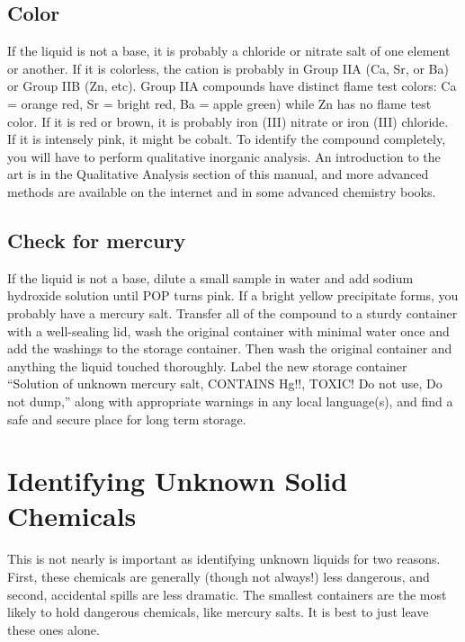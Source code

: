 \subsection{Color}
If the liquid is not a base, 
it is probably a chloride or nitrate salt of one element or another. 
If it is colorless, 
the cation is probably in Group IIA (Ca, 
Sr, 
or Ba) or Group IIB (Zn, 
etc). 
Group IIA compounds have distinct flame test colors: Ca = orange red, 
Sr = bright red, 
Ba = apple green) while Zn has no flame test color. 
If it is red or brown, 
it is probably iron (III) nitrate or iron (III) chloride. 
If it is intensely pink, 
it might be cobalt. 
To identify the compound completely, 
you will have to perform qualitative inorganic analysis. 
An introduction to the art is 
in the Qualitative Analysis section of this manual, 
and more advanced methods are available on the internet 
and in some advanced chemistry books.

\subsection{Check for mercury}
If the liquid is not a base, 
dilute a small sample in water 
and add sodium hydroxide solution until POP turns pink. 
If a bright yellow precipitate forms, 
you probably have a mercury salt. 
Transfer all of the compound to a sturdy container 
with a well-sealing lid, 
wash the original container with minimal water once 
and add the washings to the storage container. 
Then wash the original container 
and anything the liquid touched thoroughly. 
Label the new storage container ``Solution of unknown mercury salt, 
CONTAINS Hg!!, 
TOXIC! Do not use, 
Do not dump,'' along with appropriate warnings in any local language(s), 
and find a safe and secure place for long term storage.

\section{Identifying Unknown Solid Chemicals}

This is not nearly is important as identifying unknown liquids 
for two reasons. 
First, 
these chemicals are generally (though not always!) less dangerous, 
and second, 
accidental spills are less dramatic. 
The smallest containers are the most likely to hold dangerous chemicals, 
like mercury salts. 
It is best to just leave these ones alone.

